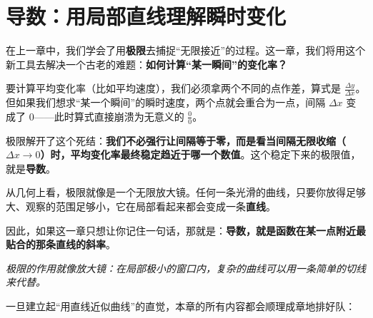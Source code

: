 \section{导数：用局部直线理解瞬时变化}

在上一章中，我们学会了用\textbf{极限}去捕捉“无限接近”的过程。这一章，我们将用这个新工具去解决一个古老的难题：\textbf{如何计算“某一瞬间”的变化率？}

要计算平均变化率（比如平均速度），我们必须拿两个不同的点作差，算式是 $\frac{\Delta y}{\Delta x}$。但如果我们想求“某一个瞬间”的瞬时速度，两个点就会重合为一点，间隔 $\Delta x$ 变成了 0——此时算式直接崩溃为无意义的 $\frac{0}{0}$。

极限解开了这个死结：\textbf{我们不必强行让间隔等于零，而是看当间隔无限收缩（$\Delta x \to 0$）时，平均变化率最终稳定趋近于哪一个数值}。这个稳定下来的极限值，就是\textbf{导数}。

从几何上看，极限就像是一个无限放大镜。任何一条光滑的曲线，只要你放得足够大、观察的范围足够小，它在局部看起来都会变成一条\textbf{直线}。

因此，如果这一章只想让你记住一句话，那就是：\textbf{导数，就是函数在某一点附近最贴合的那条直线的斜率}。

\begin{center}

\emph{极限的作用就像放大镜：在局部极小的窗口内，复杂的曲线可以用一条简单的切线来代替。}
\end{center}

一旦建立起“用直线近似曲线”的直觉，本章的所有内容都会顺理成章地排好队：

